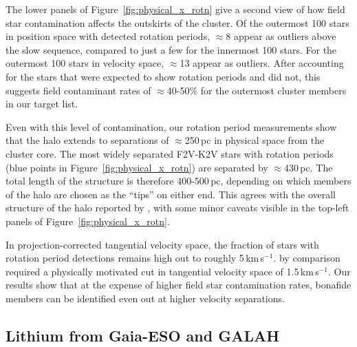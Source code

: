 \documentclass[12pt,twocolumn,tighten]{aastex63}
\newcommand{\kms}{\,km\,s$^{-1}$}
\begin{document}
The lower panels of Figure~\ref{fig:physical_x_rotn} give a second
view of how field star contamination affects the outskirts of the
cluster.  Of the outermost 100 stars in position space with detected
rotation periods, $\approx$8 appear as outliers above the slow
sequence, compared to just a few for the innermost 100 stars.  For the
outermost 100 stars in velocity space, $\approx$13 appear as outliers.
After accounting for the stars that were expected to show rotation
periods and did not, this suggests field contaminant rates of
$\approx$40-50\% for the outermost cluster members in our target list.

Even with this level of contamination, our rotation period
measurements show that the halo extends to separations of
$\approx$250\,pc in physical space from the cluster core.  The most
widely separated F2V-K2V stars with rotation periods (blue points in
Figure~\ref{fig:physical_x_rotn}) are separated by $\approx$430\,pc.
The total length of the structure is therefore 400-500\,pc, depending
on which members of the halo are chosen as the ``tips'' on either end.
This agrees with the overall structure of the halo reported by
, with some minor caveats visible
in the top-left panels of Figure~\ref{fig:physical_x_rotn}.

In projection-corrected tangential velocity space, the fraction of
stars with rotation period detections remains high out to roughly
5\kms.  \citet{meingast_2021} by comparison required a physically
motivated cut in tangential velocity space of 1.5\kms.  Our results
show that at the expense of higher field star contamination rates,
bonafide members can be identified even out at higher velocity
separations.


\subsection{Lithium from Gaia-ESO and GALAH}
\label{subsec:lithium}
\end{document}
